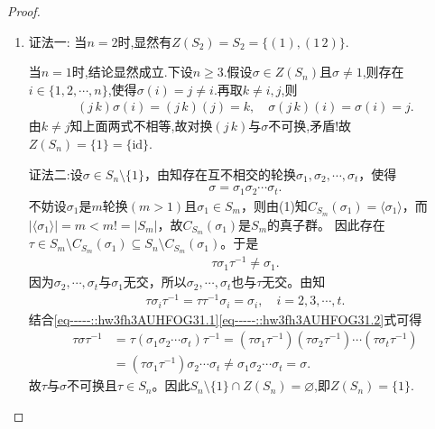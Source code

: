 \documentclass[../../main.tex]{subfiles}%
\begin{document}
\begin{proof}
\begin{enumerate}[(1)]
\begin{align*}
{}.
\end{align*}
从而
\begin{align*}
\tau \left( 1 \right) =i,\tau \left( 2 \right) =i+1,\cdots ,\tau \left( n-i+1 \right) =n,\tau \left( n-i+2 \right) =1,\cdots ,\tau \left( n \right) =i-1.
\end{align*}
于是
\begin{align*}
\tau=\begin{pmatrix}
1 & 2 & \cdots & n-i+1 & n-i+2 & \cdots & n \\
i & i+1 & \cdots & n & 1 & \cdots & i-1
\end{pmatrix},
\end{align*}
即$\tau=\sigma^{i-1}$. 故$C_{S_n}(\sigma)=\langle\sigma\rangle$.

\item {\color{blue}证法一:}
当$n=2$时,显然有$Z(S_2)=S_2=\{(1),(1\,2)\}$.

当$n=1$时,结论显然成立.下设$n\geqslant 3$.假设$\sigma \in Z(S_n)$且$\sigma \neq 1$,则存在$i\in \{1,2,\cdots,n\}$,使得$\sigma(i)=j\neq i$.再取$k\neq i,j$,则
\begin{gather*}
(j\,k)\sigma(i)=(j\,k)(j)=k,
\quad
\sigma(j\,k)(i)=\sigma(i)=j.
\end{gather*}
由$k\neq j$知上面两式不相等,故对换$(j\,k)$与$\sigma$不可换,矛盾!故$Z(S_n)=\{1\}=\{\text{id}\}$.

{\color{blue}证法二:}设$\sigma \in S_n\setminus\{1\}$，由知存在互不相交的轮换$\sigma_1,\sigma_2,\cdots,\sigma_t$，使得
\begin{align*}
\sigma = \sigma_1\sigma_2\cdots\sigma_t.
\end{align*}
不妨设$\sigma_1$是$m$轮换$(m>1)$且$\sigma_1\in S_m$，则由(1)知$C_{S_m}(\sigma_1)=\langle\sigma_1\rangle$，而$|\langle\sigma_1\rangle|=m<m!=|S_m|$，故$C_{S_m}(\sigma_1)$是$S_m$的真子群。
因此存在$\tau \in S_m\setminus C_{S_m}(\sigma_1) \subseteq S_n\setminus C_{S_m}(\sigma_1)$。于是
\begin{align}
\tau \sigma_1 \tau^{-1} \neq \sigma_1. \label{eq-----::hw3fh3AUHFOG31.1}
\end{align}
因为$\sigma_2,\cdots,\sigma_t$与$\sigma_1$无交，所以$\sigma_2,\cdots,\sigma_t$也与$\tau$无交。由知
\begin{align}
\tau \sigma_i \tau^{-1} = \tau \tau^{-1}\sigma_i = \sigma_i,\quad i=2,3,\cdots,t. \label{eq-----::hw3fh3AUHFOG31.2}
\end{align}
结合\eqref{eq-----::hw3fh3AUHFOG31.1}\eqref{eq-----::hw3fh3AUHFOG31.2}式可得
\begin{align*}
\tau \sigma \tau^{-1} &= \tau (\sigma_1\sigma_2\cdots\sigma_t) \tau^{-1} = (\tau \sigma_1 \tau^{-1})(\tau \sigma_2 \tau^{-1})\cdots(\tau \sigma_t \tau^{-1}) \\
&= (\tau \sigma_1 \tau^{-1})\sigma_2\cdots\sigma_t \neq \sigma_1\sigma_2\cdots\sigma_t = \sigma.
\end{align*}
故$\tau$与$\sigma$不可换且$\tau\in S_n$。因此$S_n\setminus \{1\}\cap Z(S_n)=\varnothing$,即$Z(S_n)=\{1\}$.
\end{enumerate}


\end{proof}
\end{document}
